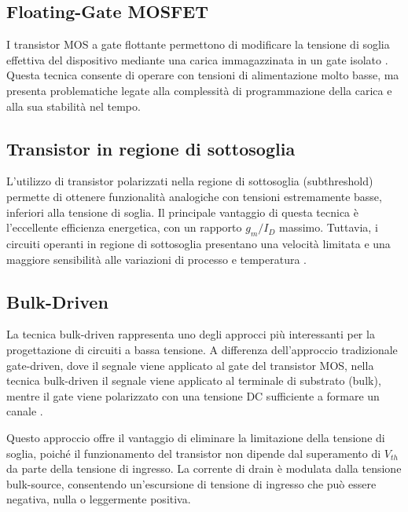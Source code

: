 \subsection{Floating-Gate MOSFET}

I transistor MOS a gate flottante permettono di modificare la tensione di soglia effettiva del dispositivo mediante una carica immagazzinata in un gate isolato \cite{Bulk-Driven_CMOS_Amplifier_With_High_EMI_Immunity}. Questa tecnica consente di operare con tensioni di alimentazione molto basse, ma presenta problematiche legate alla complessità di programmazione della carica e alla sua stabilità nel tempo.

\subsection{Transistor in regione di sottosoglia}

L'utilizzo di transistor polarizzati nella regione di sottosoglia (subthreshold) permette di ottenere funzionalità analogiche con tensioni estremamente basse, inferiori alla tensione di soglia. Il principale vantaggio di questa tecnica è l'eccellente efficienza energetica, con un rapporto $g_m/I_D$ massimo. Tuttavia, i circuiti operanti in regione di sottosoglia presentano una velocità limitata e una maggiore sensibilità alle variazioni di processo e temperatura \cite{Bulk-Driven_CMOS_Amplifier_With_High_EMI_Immunity}.

\subsection{Bulk-Driven}

La tecnica bulk-driven rappresenta uno degli approcci più interessanti per la progettazione di circuiti a bassa tensione. A differenza dell'approccio tradizionale gate-driven, dove il segnale viene applicato al gate del transistor MOS, nella tecnica bulk-driven il segnale viene applicato al terminale di substrato (bulk), mentre il gate viene polarizzato con una tensione DC sufficiente a formare un canale \cite{Bulk-Driven_CMOS_Amplifier_With_High_EMI_Immunity}.

Questo approccio offre il vantaggio di eliminare la limitazione della tensione di soglia, poiché il funzionamento del transistor non dipende dal superamento di $V_{th}$ da parte della tensione di ingresso. La corrente di drain è modulata dalla tensione bulk-source, consentendo un'escursione di tensione di ingresso che può essere negativa, nulla o leggermente positiva.

